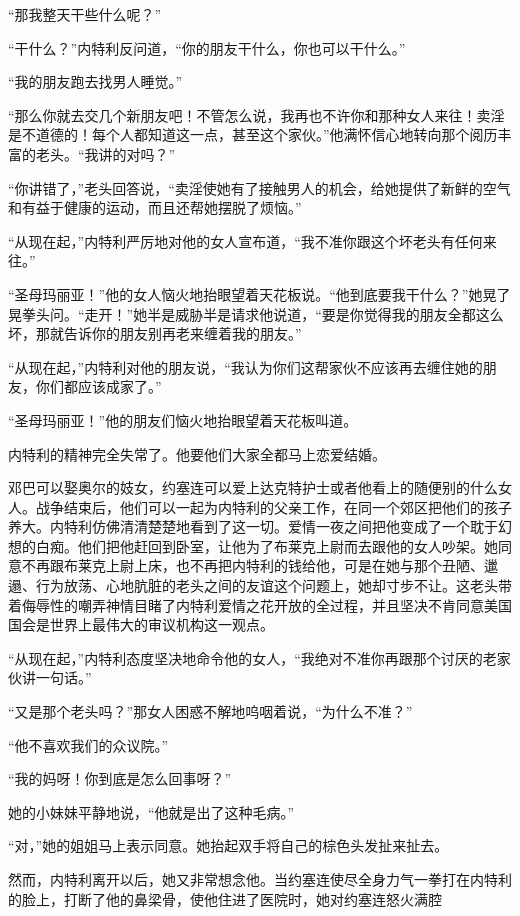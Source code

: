     “那我整天干些什么呢？”

    “干什么？”内特利反问道，“你的朋友干什么，你也可以干什么。”

    “我的朋友跑去找男人睡觉。”

    “那么你就去交几个新朋友吧！不管怎么说，我再也不许你和那种女人来往！卖淫是不道德的！每个人都知道这一点，甚至这个家伙。”他满怀信心地转向那个阅历丰富的老头。“我讲的对吗？”

    “你讲错了，”老头回答说，“卖淫使她有了接触男人的机会，给她提供了新鲜的空气和有益于健康的运动，而且还帮她摆脱了烦恼。”

    “从现在起，”内特利严厉地对他的女人宣布道，“我不准你跟这个坏老头有任何来往。”

    “圣母玛丽亚！”他的女人恼火地抬眼望着天花板说。“他到底要我干什么？”她晃了晃拳头问。“走开！”她半是威胁半是请求他说道，“要是你觉得我的朋友全都这么坏，那就告诉你的朋友别再老来缠着我的朋友。”

    “从现在起，”内特利对他的朋友说，“我认为你们这帮家伙不应该再去缠住她的朋友，你们都应该成家了。”

    “圣母玛丽亚！”他的朋友们恼火地抬眼望着天花板叫道。

    内特利的精神完全失常了。他要他们大家全都马上恋爱结婚。

    邓巴可以娶奥尔的妓女，约塞连可以爱上达克特护士或者他看上的随便别的什么女人。战争结束后，他们可以一起为内特利的父亲工作，在同一个郊区把他们的孩子养大。内特利仿佛清清楚楚地看到了这一切。爱情一夜之间把他变成了一个耽于幻想的白痴。他们把他赶回到卧室，让他为了布莱克上尉而去跟他的女人吵架。她同意不再跟布莱克上尉上床，也不再把内特利的钱给他，可是在她与那个丑陋、邋遢、行为放荡、心地肮脏的老头之间的友谊这个问题上，她却寸步不让。这老头带着侮辱性的嘲弄神情目睹了内特利爱情之花开放的全过程，并且坚决不肯同意美国国会是世界上最伟大的审议机构这一观点。

    “从现在起，”内特利态度坚决地命令他的女人，“我绝对不准你再跟那个讨厌的老家伙讲一句话。”

    “又是那个老头吗？”那女人困惑不解地呜咽着说，“为什么不准？”

    “他不喜欢我们的众议院。”

    “我的妈呀！你到底是怎么回事呀？”

    她的小妹妹平静地说，“他就是出了这种毛病。”

    “对，”她的姐姐马上表示同意。她抬起双手将自己的棕色头发扯来扯去。

    然而，内特利离开以后，她又非常想念他。当约塞连使尽全身力气一拳打在内特利的脸上，打断了他的鼻梁骨，使他住进了医院时，她对约塞连怒火满腔
